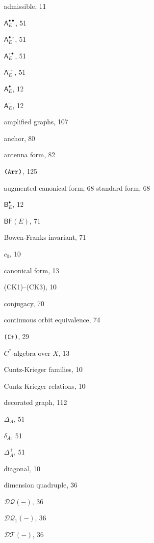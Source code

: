 \documentclass[12pt]{amsbook}%
\theoremstyle{defin}
\theoremstyle{remark}
\numberwithin{equation}{chapter}
\numberwithin{theor}{section}
\newcommand{\BF}{\mathsf{BF}}
\newcommand{\CCCp}{\mbox{\texttt{\textup{(C+)}}}}
\newcommand{\AAArr}{\mbox{\texttt{\textup{(Arr)}}}}
\newcommand{\DT}{\mathcal{DT}}
\newcommand{\DQ}{\mathcal{DQ}}
\newcommand{\DQp}{\mathcal{DQ}_1}
\newcommand{\adjRR}{\mathsf{A}^{\bullet\bullet}}
\newcommand{\adjRS}{\mathsf{A}^{\bullet\circ}}
\newcommand{\adjSR}{\mathsf{A}^{\circ\bullet }}
\newcommand{\adjSS}{\mathsf{A}^{\circ\circ}}
\begin{document}
 
%
%
\begin{theindex}

  \item admissible, 11
  \item $\adjRR_E$, 51
  \item $\adjRS_E$, 51
  \item $\adjSR_E$, 51
  \item $\adjSS_E$, 51
  \item $\mathsf{A}^\bullet_E$, 12
  \item $\mathsf{A}^\circ_E$, 12
  \item amplified graphs, 107
  \item anchor, 80
  \item antenna form, 82
  \item $\AAArr$, 125
  \item augmented
    \subitem canonical form, 68
    \subitem standard form, 68

  \indexspace

  \item $\mathsf{B}^\bullet_E$, 12
  \item $\BF(E)$, 71
  \item Bowen-Franks invariant, 71

  \indexspace

  \item $c_0$, 10
  \item canonical form, 13
  \item (CK1)--(CK3), 10
  \item conjugacy, 70
  \item continuous orbit equivalence, 74
  \item \CCCp, 29
  \item $C^*$-algebra over $X$, 13
  \item Cuntz-Krieger families, 10
  \item Cuntz-Krieger relations, 10

  \indexspace

  \item decorated graph, 112
  \item $\Delta_A$, 51
  \item $\delta_A$, 51
  \item $\Delta_A^+$, 51
  \item diagonal, 10
  \item dimension quadruple, 36
  \item $\DQ(-)$, 36
  \item $\DQp(-)$, 36
  \item $\DT(-)$, 36


\end{theindex}
\end{document}
